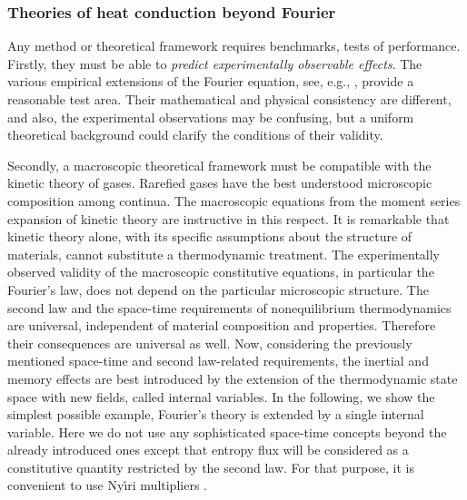 \documentclass[sn-mathphys]{sn-jnl}%
\theoremstyle{thmstyleone}%
\theoremstyle{thmstyletwo}%
\theoremstyle{thmstylethree}%
\begin{document}
{\subsubsection{Theories of heat conduction beyond Fourier}
Any method or theoretical framework requires benchmarks, tests of performance. Firstly, they must be able to \emph{predict experimentally observable effects}. The various empirical extensions of the Fourier equation, see, e.g., \cite{JosPre89a,JosPre90a}, provide a reasonable test area. Their mathematical and physical consistency are different, and also, the experimental observations may be confusing, but a uniform theoretical background could clarify the conditions of their validity.

Secondly, a macroscopic theoretical framework must be compatible with the kinetic theory of gases. Rarefied gases have the best understood microscopic composition among continua. The macroscopic equations from the moment series expansion of kinetic theory are instructive in this respect. It is remarkable that kinetic theory alone, with its specific assumptions about the structure of materials, cannot substitute a thermodynamic treatment. The experimentally observed validity of the macroscopic constitutive equations, in particular the Fourier's law, does not depend on the particular microscopic structure. The second law and the space-time requirements of nonequilibrium thermodynamics are universal, independent of material composition and properties. Therefore their consequences are universal as well. Now, considering the previously mentioned space-time and second law-related requirements, the inertial and memory effects are best introduced by the extension of the thermodynamic state space with new fields, called internal variables. In the following, we show the simplest possible example, Fourier's theory is extended by a single internal variable. Here we do not use any sophisticated space-time concepts beyond the already introduced ones except that entropy flux will be considered as a constitutive quantity restricted by the second law. For that purpose, it is convenient to use Ny\'\i{}ri multipliers \cite{Nyi91a1}.

}
\end{document}
